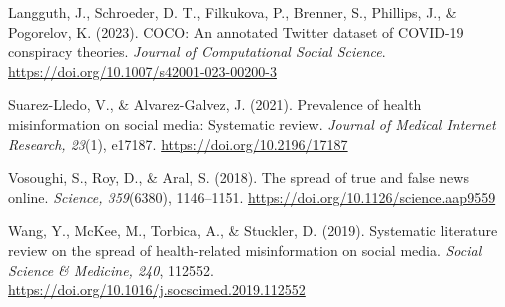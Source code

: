 \documentclass[12pt]{article}
\newcommand{\aparef}[1]{\noindent\hangindent=0.5in\hangafter=1 #1\par}
\begin{document}
\aparef{Langguth, J., Schroeder, D. T., Filkukova, P., Brenner, S., Phillips, J., \& Pogorelov, K. (2023). COCO: An annotated Twitter dataset of COVID-19 conspiracy theories. \textit{Journal of Computational Social Science}. \url{https://doi.org/10.1007/s42001-023-00200-3}}

\aparef{Suarez-Lledo, V., \& Alvarez-Galvez, J. (2021). Prevalence of health misinformation on social media: Systematic review. \textit{Journal of Medical Internet Research, 23}(1), e17187. \url{https://doi.org/10.2196/17187}}

\aparef{Vosoughi, S., Roy, D., \& Aral, S. (2018). The spread of true and false news online. \textit{Science, 359}(6380), 1146--1151. \url{https://doi.org/10.1126/science.aap9559}}

\aparef{Wang, Y., McKee, M., Torbica, A., \& Stuckler, D. (2019). Systematic literature review on the spread of health-related misinformation on social media. \textit{Social Science \& Medicine, 240}, 112552. \url{https://doi.org/10.1016/j.socscimed.2019.112552}}
\end{document}
